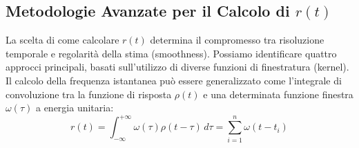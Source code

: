 \subsection{Metodologie Avanzate per il Calcolo di $r(t)$}
La scelta di come calcolare $r(t)$ determina il compromesso tra risoluzione temporale e regolarità della stima (smoothness). Possiamo identificare quattro approcci principali, basati sull'utilizzo di diverse funzioni di finestratura (kernel). 
Il calcolo della frequenza istantanea può essere generalizzato come l'integrale di convoluzione tra la funzione di risposta $\rho(t)$ e una determinata funzione finestra $\omega(\tau)$ a energia unitaria:
\begin{equation}
r(t) = \int_{-\infty}^{+\infty} \omega(\tau) \rho(t-\tau) \, d\tau = \sum_{i=1}^{n} \omega(t - t_i)
\end{equation}

